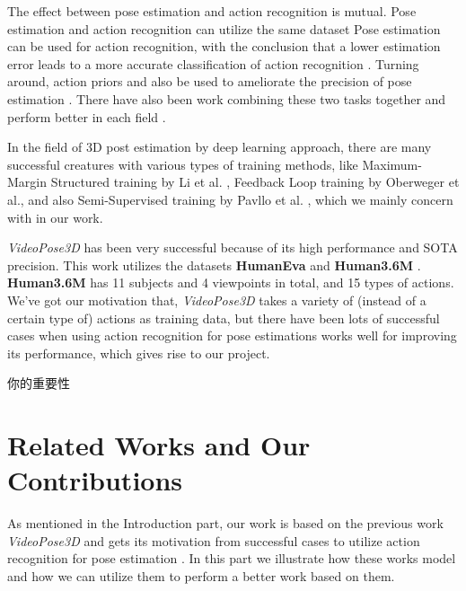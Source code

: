 \documentclass[10pt,twocolumn,letterpaper]{article}
\begin{document}
The effect between pose estimation and action recognition is mutual. Pose estimation
and action recognition can utilize the same dataset \cite{jhuang2013towards, andriluka2018posetrack}
Pose estimation can be used for action recognition, with the conclusion that a lower
estimation error leads to a more accurate classification of action recognition \cite{yao2011does}. 
Turning around, action priors and also be used to ameliorate the precision of pose estimation 
\cite{yao2012coupled, iqbal2017pose, gall20102d}. There have also been work combining these two tasks 
together and perform better in each field \cite{7298734, luvizon20182d}.


In the field of 3D post estimation by deep learning approach, there are many successful creatures 
with various types of training methods, like Maximum-Margin Structured training by Li et al. 
\cite{li2015maximum}, Feedback Loop training by Oberweger et al.\cite{oberweger2015training}, and 
also Semi-Supervised training by Pavllo et al. \cite{pavllo20193d}, which we mainly concern with 
in our work.

\textit{VideoPose3D} has been very successful because of its high performance and SOTA precision.
This work utilizes the datasets \textbf{HumanEva} \cite{sigal2010humaneva} and \textbf{Human3.6M} 
\cite{ionescu2013human3}. \textbf{Human3.6M} has 11 subjects and 4 viewpoints in total, and 15 types of actions.
We've got our motivation that, \textit{VideoPose3D} takes a variety of (instead of a certain type of) actions 
as training data, but there have been lots of successful cases when using action recognition for pose estimations 
works well for improving its performance, which gives rise to our project.

你的重要性

\section{Related Works and Our Contributions}

As mentioned in the Introduction part, our work is based on the previous work \textit{VideoPose3D} 
\cite{pavllo20193d} and gets its motivation from successful cases to utilize action recognition for 
pose estimation \cite{yao2012coupled, iqbal2017pose, gall20102d}. In this part we illustrate how
these works model and how we can utilize them to perform a better work based on them.

\end{document}
